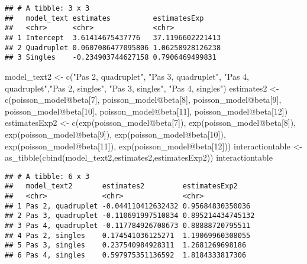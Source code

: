\documentclass[
]{article}
\newenvironment{Shaded}{\begin{snugshade}}{\end{snugshade}}
\newcommand{\DecValTok}[1]{\textcolor[rgb]{0.00,0.00,0.81}{#1}}
\newcommand{\FunctionTok}[1]{\textcolor[rgb]{0.00,0.00,0.00}{#1}}
\newcommand{\NormalTok}[1]{#1}
\newcommand{\OtherTok}[1]{\textcolor[rgb]{0.56,0.35,0.01}{#1}}
\newcommand{\SpecialCharTok}[1]{\textcolor[rgb]{0.00,0.00,0.00}{#1}}
\newcommand{\StringTok}[1]{\textcolor[rgb]{0.31,0.60,0.02}{#1}}
\begin{document}
\begin{verbatim}
## # A tibble: 3 x 3
##   model_text estimates          estimatesExp    
##   <chr>      <chr>              <chr>           
## 1 Intercept  3.61414675437776   37.1196602221413
## 2 Quadruplet 0.0607086477095806 1.06258928126238
## 3 Singles    -0.234903744627158 0.7906469499831
\end{verbatim}

\begin{Shaded}
\begin{Highlighting}[]
\NormalTok{model\_text2 }\OtherTok{\textless{}{-}} \FunctionTok{c}\NormalTok{(}\StringTok{"Pas 2, quadruplet"}\NormalTok{, }\StringTok{"Pas 3, quadruplet"}\NormalTok{, }\StringTok{"Pas 4, quadruplet"}\NormalTok{,}\StringTok{"Pas 2, singles"}\NormalTok{, }\StringTok{"Pas 3, singles"}\NormalTok{, }\StringTok{"Pas 4, singles"}\NormalTok{)}
\NormalTok{estimates2 }\OtherTok{\textless{}{-}} \FunctionTok{c}\NormalTok{(poisson\_model}\SpecialCharTok{@}\NormalTok{beta[}\DecValTok{7}\NormalTok{], poisson\_model}\SpecialCharTok{@}\NormalTok{beta[}\DecValTok{8}\NormalTok{], poisson\_model}\SpecialCharTok{@}\NormalTok{beta[}\DecValTok{9}\NormalTok{], poisson\_model}\SpecialCharTok{@}\NormalTok{beta[}\DecValTok{10}\NormalTok{], poisson\_model}\SpecialCharTok{@}\NormalTok{beta[}\DecValTok{11}\NormalTok{], poisson\_model}\SpecialCharTok{@}\NormalTok{beta[}\DecValTok{12}\NormalTok{])}
\NormalTok{estimatesExp2 }\OtherTok{\textless{}{-}} \FunctionTok{c}\NormalTok{(}\FunctionTok{exp}\NormalTok{(poisson\_model}\SpecialCharTok{@}\NormalTok{beta[}\DecValTok{7}\NormalTok{]), }\FunctionTok{exp}\NormalTok{(poisson\_model}\SpecialCharTok{@}\NormalTok{beta[}\DecValTok{8}\NormalTok{]), }\FunctionTok{exp}\NormalTok{(poisson\_model}\SpecialCharTok{@}\NormalTok{beta[}\DecValTok{9}\NormalTok{]), }\FunctionTok{exp}\NormalTok{(poisson\_model}\SpecialCharTok{@}\NormalTok{beta[}\DecValTok{10}\NormalTok{]), }\FunctionTok{exp}\NormalTok{(poisson\_model}\SpecialCharTok{@}\NormalTok{beta[}\DecValTok{11}\NormalTok{]), }\FunctionTok{exp}\NormalTok{(poisson\_model}\SpecialCharTok{@}\NormalTok{beta[}\DecValTok{12}\NormalTok{]))}
\NormalTok{interactiontable }\OtherTok{\textless{}{-}} \FunctionTok{as\_tibble}\NormalTok{(}\FunctionTok{cbind}\NormalTok{(model\_text2,estimates2,estimatesExp2))}
\NormalTok{interactiontable}
\end{Highlighting}
\end{Shaded}

\begin{verbatim}
## # A tibble: 6 x 3
##   model_text2       estimates2         estimatesExp2    
##   <chr>             <chr>              <chr>            
## 1 Pas 2, quadruplet -0.044110412632432 0.95684830350036 
## 2 Pas 3, quadruplet -0.110691997510834 0.895214434745132
## 3 Pas 4, quadruplet -0.117784926708673 0.88888720795511 
## 4 Pas 2, singles    0.174541036125271  1.19069960308055 
## 5 Pas 3, singles    0.237540984928311  1.2681269698186  
## 6 Pas 4, singles    0.597975351136592  1.8184333817306
\end{verbatim}
\end{document}
